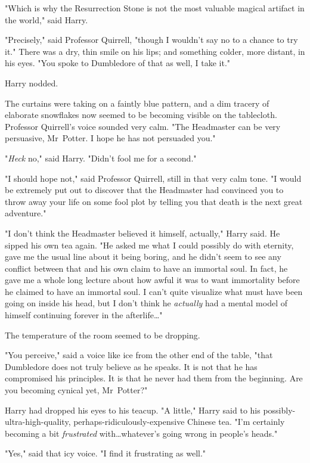 "Which is why the Resurrection Stone is not the most valuable magical artifact
in the world," said Harry.

"Precisely," said Professor Quirrell, "though I wouldn't say no to a chance to
try it." There was a dry, thin smile on his lips; and something colder, more
distant, in his eyes. "You spoke to Dumbledore of that as well, I take it."

Harry nodded.

The curtains were taking on a faintly blue pattern, and a dim tracery of
elaborate snowflakes now seemed to be becoming visible on the tablecloth.
Professor Quirrell's voice sounded very calm. "The Headmaster can be very
persuasive, Mr~Potter. I hope he has not persuaded you."

"\emph{Heck} no," said Harry. "Didn't fool me for a second."

"I should hope not," said Professor Quirrell, still in that very calm tone. "I
would be extremely put out to discover that the Headmaster had convinced you to
throw away your life on some fool plot by telling you that death is the next
great adventure."

"I don't think the Headmaster believed it himself, actually," Harry said. He
sipped his own tea again. "He asked me what I could possibly do with eternity,
gave me the usual line about it being boring, and he didn't seem to see any
conflict between that and his own claim to have an immortal soul. In fact, he
gave me a whole long lecture about how awful it was to want immortality before
he claimed to have an immortal soul. I can't quite visualize what must have
been going on inside his head, but I don't think he \emph{actually} had a
mental model of himself continuing forever in the afterlife…"

The temperature of the room seemed to be dropping.

"You perceive," said a voice like ice from the other end of the table, "that
Dumbledore does not truly believe as he speaks. It is not that he has
compromised his principles. It is that he never had them from the beginning.
Are you becoming cynical yet, Mr~Potter?"

Harry had dropped his eyes to his teacup. "A little," Harry said to his
possibly-ultra-high-quality, perhaps-ridiculously-expensive Chinese tea. "I'm
certainly becoming a bit \emph{frustrated} with…whatever's going wrong
in people's heads."

"Yes," said that icy voice. "I find it frustrating as well."

